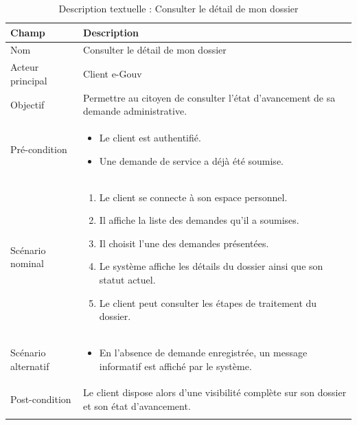 \begin{longtable}{|p{4cm}|p{12cm}|}
\hline

\rowcolor{gray!20}
\textbf{Champ} & \textbf{Description} \\ \hline
\endfirsthead

 

Nom & Consulter le détail de mon dossier \\ \hline

Acteur principal & Client e-Gouv \\ \hline

Objectif & Permettre au citoyen de consulter l’état d’avancement de sa demande administrative. \\ \hline

Pré-condition &
\begin{itemize}
    \item Le client est authentifié.
    \item Une demande de service a déjà été soumise.
\end{itemize}
\\ \hline

Scénario nominal &
\begin{enumerate}
    \item Le client se connecte à son espace personnel. 
    \item Il affiche la liste des demandes qu'il a soumises. 
    \item Il choisit l'une des demandes présentées.
    \item Le système affiche les détails du dossier ainsi que son statut actuel.
    \item Le client peut consulter les étapes de traitement du dossier.
\end{enumerate}
\\ \hline

Scénario alternatif &
\begin{itemize}
    \item En l'absence de demande enregistrée, un message informatif est affiché par le système.
\end{itemize}
\\ \hline

Post-condition & Le client dispose alors d'une visibilité complète sur son dossier et son état d'avancement. \\ \hline

\caption{Description textuelle : Consulter le détail de mon dossier}
\label{tab:uc-suivre-dossier}

\end{longtable}


